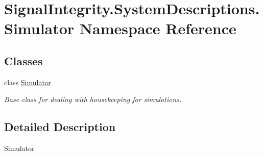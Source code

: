 \hypertarget{namespaceSignalIntegrity_1_1SystemDescriptions_1_1Simulator}{}\section{Signal\+Integrity.\+System\+Descriptions.\+Simulator Namespace Reference}
\label{namespaceSignalIntegrity_1_1SystemDescriptions_1_1Simulator}
\subsection*{Classes}
\begin{DoxyCompactItemize}
\item 
class \hyperlink{classSignalIntegrity_1_1SystemDescriptions_1_1Simulator_1_1Simulator}{Simulator}
\begin{DoxyCompactList}\small\item\em Base class for dealing with housekeeping for simulations. \end{DoxyCompactList}\end{DoxyCompactItemize}


\subsection{Detailed Description}
\begin{DoxyVerb}Simulator\end{DoxyVerb}
 